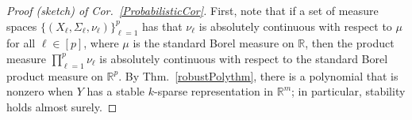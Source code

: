 \documentclass[9pt,twocolumn]{pnas-new}
\newtheorem{problem}{Problem}
\newtheorem{corollary}{Corollary}
\renewcommand{\eqref}[1]{\textnormal{[\ref{#1}]}}
\begin{document}
\begin{proof}[Proof (sketch) of Cor.~\ref{ProbabilisticCor}]
First, note that if a set of measure spaces $\{(X_{\ell}, \Sigma_{\ell}, \nu_{\ell})\}_{\ell=1}^p$ has that $\nu_{\ell}$ is absolutely continuous with respect to $\mu$ for all $\ell \in [p]$, where $\mu$ is the standard Borel measure on $\mathbb{R}$, then the product measure $\prod_{\ell=1}^p \nu_{\ell}$ is absolutely continuous with respect to the standard Borel product measure on $\mathbb{R}^p$. %
By Thm.~\ref{robustPolythm}, there is a polynomial that is nonzero when $Y$ has a stable $k$-sparse representation in $\mathbb{R}^m$; in particular, stability holds almost surely.
\end{proof}


%

\end{document}
